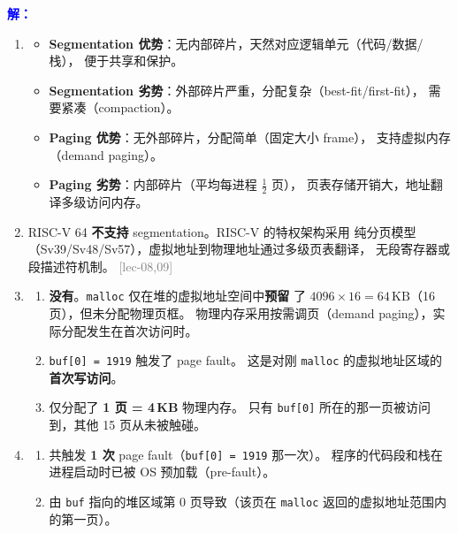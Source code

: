 \documentclass[11pt,a4paper]{article}
\newcommand{\lec}[1]{\textcolor{gray}{[lec-#1]}}
\newcommand{\ans}{\par\noindent\textcolor{blue}{\textbf{解：}}}
\begin{document}
\ans

\begin{enumerate}[label=(\arabic*),leftmargin=*]

  \item
  \begin{itemize}[nosep]
    \item \textbf{Segmentation 优势}：无内部碎片，天然对应逻辑单元（代码/数据/栈），
          便于共享和保护。
    \item \textbf{Segmentation 劣势}：外部碎片严重，分配复杂（best-fit/first-fit），
          需要紧凑（compaction）。
    \item \textbf{Paging 优势}：无外部碎片，分配简单（固定大小 frame），
          支持虚拟内存（demand paging）。
    \item \textbf{Paging 劣势}：内部碎片（平均每进程 $\tfrac12$ 页），
          页表存储开销大，地址翻译多级访问内存。
  \end{itemize}

  \item RISC-V 64 \textbf{不支持} segmentation。RISC-V 的特权架构采用
        纯分页模型（Sv39/Sv48/Sv57），虚拟地址到物理地址通过多级页表翻译，
        无段寄存器或段描述符机制。 \lec{08,09}

  \item
  \begin{enumerate}[label=(\roman*)]
    \item \textbf{没有}。\texttt{malloc} 仅在堆的虚拟地址空间中\textbf{预留}
          了 $4096\times 16 = 64\,\text{KB}$（16 页），但未分配物理页框。
          物理内存采用按需调页（demand paging），实际分配发生在首次访问时。
    \item \texttt{buf[0] = 1919} 触发了 page fault。
          这是对刚 \texttt{malloc} 的虚拟地址区域的\textbf{首次写访问}。
    \item 仅分配了 \textbf{1 页 = 4\,KB} 物理内存。
          只有 \texttt{buf[0]} 所在的那一页被访问到，其他 15 页从未被触碰。
  \end{enumerate}

  \item
  \begin{enumerate}[label=(\roman*)]
    \item 共触发 \textbf{1 次} page fault（\texttt{buf[0] = 1919} 那一次）。
          程序的代码段和栈在进程启动时已被 OS 预加载（pre-fault）。
    \item 由 \texttt{buf} 指向的堆区域第 0 页导致（该页在 \texttt{malloc}
          返回的虚拟地址范围内的第一页）。
  \end{enumerate}


\end{enumerate}
\end{document}
